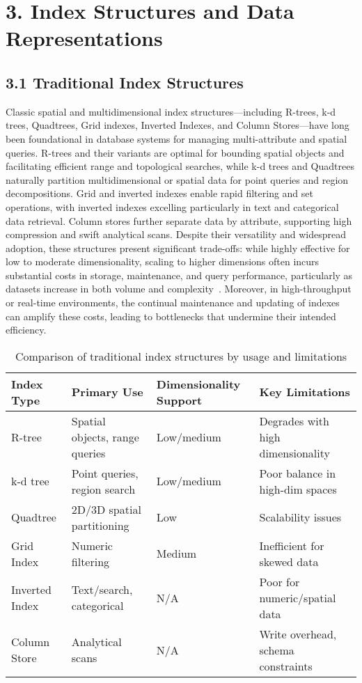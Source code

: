 \documentclass[11pt]{article}
\begin{document}

\section{3. Index Structures and Data Representations}

\subsection{3.1 Traditional Index Structures}

Classic spatial and multidimensional index structures—including R-trees, k-d trees, Quadtrees, Grid indexes, Inverted Indexes, and Column Stores—have long been foundational in database systems for managing multi-attribute and spatial queries. R-trees and their variants are optimal for bounding spatial objects and facilitating efficient range and topological searches, while k-d trees and Quadtrees naturally partition multidimensional or spatial data for point queries and region decompositions. Grid and inverted indexes enable rapid filtering and set operations, with inverted indexes excelling particularly in text and categorical data retrieval. Column stores further separate data by attribute, supporting high compression and swift analytical scans. Despite their versatility and widespread adoption, these structures present significant trade-offs: while highly effective for low to moderate dimensionality, scaling to higher dimensions often incurs substantial costs in storage, maintenance, and query performance, particularly as datasets increase in both volume and complexity~\cite{111,112}. Moreover, in high-throughput or real-time environments, the continual maintenance and updating of indexes can amplify these costs, leading to bottlenecks that undermine their intended efficiency.

\begin{table}[t]
\centering
\begin{tabular}{|l|l|l|l|}
\hline
\textbf{Index Type} & \textbf{Primary Use} & \textbf{Dimensionality Support} & \textbf{Key Limitations} \\
\hline
R-tree & Spatial objects, range queries & Low/medium & Degrades with high dimensionality \\
k-d tree & Point queries, region search & Low/medium & Poor balance in high-dim spaces \\
Quadtree & 2D/3D spatial partitioning & Low & Scalability issues \\
Grid Index & Numeric filtering & Medium & Inefficient for skewed data \\
Inverted Index & Text/search, categorical & N/A & Poor for numeric/spatial data \\
Column Store & Analytical scans & N/A & Write overhead, schema constraints \\
\hline
\end{tabular}
\caption{Comparison of traditional index structures by usage and limitations}
\label{tab:traditional_indexes}
\end{table}
\end{document}
